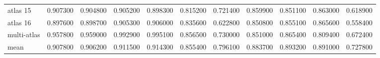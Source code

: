 \documentclass[a4paper]{article}
\begin{document}
\begin{landscape}
\begin{tabular}{lrrrrrrrrrr}
atlas 15 & 0.907300 & 0.904800 & 0.905200 & 0.898300 & 0.815200 & 0.721400 & 0.859900 & 0.851100 & 0.863000 & 0.618900 \\
atlas 16 & 0.897600 & 0.898700 & 0.905300 & 0.906000 & 0.835600 & 0.622800 & 0.850800 & 0.855100 & 0.865600 & 0.558400 \\
multi-atlas & 0.957800 & 0.959000 & 0.992900 & 0.995100 & 0.856500 & 0.730000 & 0.851000 & 0.865400 & 0.809400 & 0.672400 \\
mean & 0.907800 & 0.906200 & 0.911500 & 0.914300 & 0.855400 & 0.796100 & 0.883700 & 0.893200 & 0.891000 & 0.727800 \\
\bottomrule
\end{tabular}

\end{landscape}
\end{document}
